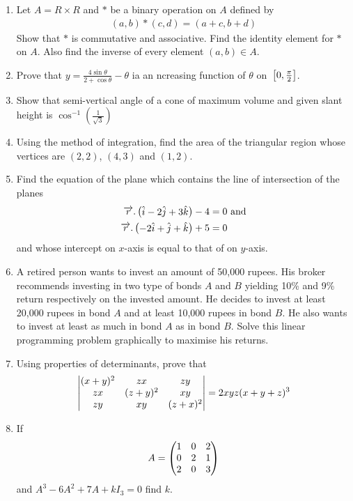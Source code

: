 \documentclass[journal,12pt,onecolumn]{IEEEtran}
\renewcommand\thesection{\arabic{section}}
\begin{document}
\begin{enumerate}[label=\thesection.\arabic*.,ref=\thesection.\theenumi]
\item Let $A = R \times R$ and $*$ be a binary operation on $A$ defined by
	\begin{align}
		(a, b) * (c, d) = (a + c, b + d)
	\end{align}
Show that $*$ is commutative and associative. Find the identity element for $*$
on $A$. Also find the inverse of every element $(a, b) \in A$.

\item Prove that $ y = \frac{4\sin \theta}{2+ \cos \theta} - \theta$ ia an ncreasing function of $\theta$ on ${}\left[0,\frac{\pi}{2}\right]$.

\item Show that semi-vertical angle of a cone of maximum volume and given slant height is
$\cos^{-1}\left( \frac{1}{\sqrt{3}} \right)$

\item Using the method of integration, find the area of the triangular region whose vertices are $(2, 2)$, $(4, 3)$ and $(1, 2)$.

\item Find the equation of the plane which contains the line of intersection of the planes
	\begin{align}
		\overrightarrow{r}.\begin{pmatrix}\hat{i} - 2\hat{j} + 3\hat{k}\end{pmatrix} - 4 &= 0 \text{  and}\\
		\overrightarrow{r}.\begin{pmatrix}-2\hat{i} + \hat{j} + \hat{k}\end{pmatrix} + 5 &= 0
	\end{align}
and whose intercept on $x$-axis is equal to that of on $y$-axis.

\item  A retired person wants to invest an amount of 50,000 rupees. His broker recommends investing in two type of bonds $A$ and $B$ yielding 10\% and 9\% return respectively on the invested amount. He decides to invest at least
20,000 rupees in bond $A$ and at least 10,000 rupees in bond $B$. He also wants to invest at least as much in bond $A$ as in bond $B$. Solve this linear programming problem graphically to maximise his returns.

\item Using properties of determinants, prove that
	\begin{align}
		\begin{vmatrix}(x + y)^2 & zx & zy \\
		zx & (z+y)^2 & xy \\
		zy & xy & (z+x)^2\end{vmatrix}
		 = 2xyz (x + y + z)^3
	\end{align}
	
\item If 
	\begin{align}
		A = \begin{pmatrix}1 & 0 & 2\\
		0 & 2 & 1 \\
		2 & 0 & 3\end{pmatrix}
	\end{align}
and $A^3-6A^2+7A+kI_3=0$ find $k$.

\end{enumerate}
\end{document}
